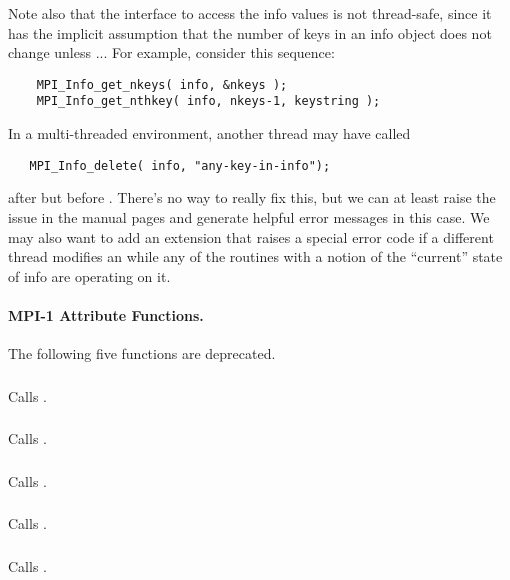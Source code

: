 \documentclass{article}
\begin{document}
Note also that the interface to access the info values is not
thread-safe, since it has the implicit assumption that the number of
keys in an info object does not change unless ...
For example, consider this sequence:
\begin{verbatim}
    MPI_Info_get_nkeys( info, &nkeys );
    MPI_Info_get_nthkey( info, nkeys-1, keystring );
\end{verbatim}
In a multi-threaded environment, another thread may have called
\begin{verbatim}
   MPI_Info_delete( info, "any-key-in-info");
\end{verbatim}
after  but before
.  There's no way to really fix this, but
we can at least raise the issue in the manual pages and generate
helpful error messages in this case.  We may also want to add an
extension that raises a special error code if a different thread
modifies an  while any of the routines with a notion of
the ``current'' state of info are operating on it.

\paragraph{MPI-1 Attribute Functions.}
The following five functions are deprecated.

\subsubsection{}
Calls .

\subsubsection{}
Calls .

\subsubsection{}
Calls .

\subsubsection{}
Calls .

\subsubsection{}
Calls .
\end{document}
